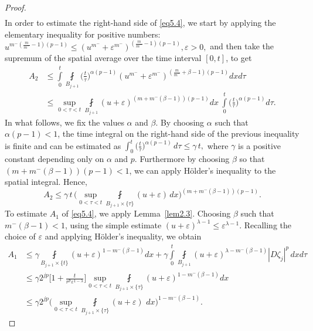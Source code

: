 \documentclass[a4paper,11pt,fullpage]{article}
\numberwithin{equation}{section}
\begin{document}
\begin{proof}
\begin{align}
\end{align}
In order to estimate the right-hand side of \eqref{eq5.4}, we start by applying the elementary inequality for positive numbers: $u^{m^-(\frac{m}{m^-}-1)(p-1)} 
\leqslant(u^{m^-}+\varepsilon^{m^-})^{(\frac{m}{m^-}-1)(p-1)}, \varepsilon>0, $ and then take the supremum of the spatial average over the time interval $[0,t]$, to get
\begin{align*}
A_2&\leqslant\int\limits_0^{t}\fint\limits_{B_{j+1}}\Big(\frac{t}{\tau}\Big)^{\alpha(p-1)} (u^{m^{-}}+\varepsilon^{m^{-}})^{(\frac{m}{m^{-}}+\beta -1)(p-1)} dx d\tau
\\&\leqslant \sup\limits_{0<\tau<t}\fint\limits_{B_{j+1}}(u+\varepsilon)^{(m+m^{-}(\beta -1))(p-1)} dx \ \int\limits_0^t \Big(\frac{t}{\tau}\Big)^{\alpha(p-1)} d\tau.
\end{align*}
In what follows, we fix the values $\alpha$ and $\beta$. By choosing $\alpha$ such that $\alpha(p-1)<1$, the time integral on the right-hand side of the previous inequality is finite and can be estimated as
$\int_0^t \Big(\frac{t}{\tau}\Big)^{\alpha(p-1)}\, d\tau 
\leqslant \gamma\, t,$
where $\gamma$ is a positive constant depending only on $\alpha$ and $p$. Furthermore by choosing $\beta$ so that $(m+m^-(\beta-1))(p-1)<1$,  we can apply H\"older's inequality to the spatial integral. Hence,
\begin{equation}\label{eq5.5}
A_2\leqslant \gamma \,t \,\Big(\sup\limits_{0<\tau<t}\fint\limits_{ B_{j+1}\times \{\tau\}}(u+\varepsilon) \,dx\Big)^{(m+m^{-}(\beta -1))(p-1)}.
\end{equation}
To estimate $A_1$ of \eqref{eq5.4}, we apply Lemma~\ref{lem2.3}. 
Choosing $\beta$ such that $m^{-}(\beta-1)<1$,  using the simple estimate   $(u+\varepsilon)^{\lambda-1}\leqslant \varepsilon^{\lambda-1}$. Recalling the choice of $\varepsilon$
 and applying H\"older's inequality, we obtain
\begin{equation}\label{eq5.6}
\begin{aligned}
A_1&\leqslant \gamma\fint\limits_{B_{j+1}\times\{t\}}(u+\varepsilon)^{1-m^-(\beta-1)} dx+\gamma \int\limits_0^t\fint\limits_{B_{j+1}}
(u+\varepsilon)^{\lambda-m^-(\beta-1)}|D \zeta_{j}|^{p}\,dxd\tau\\
&\leqslant \gamma 2^{jp}\bigg[1+ \frac{t}{r^{p}\varepsilon^{1-\lambda}}\bigg]\sup\limits_{0<\tau<t}\fint\limits_{B_{j+1}\times\{\tau\}}
(u+\varepsilon)^{1-m^-(\beta-1)} dx\\&\leqslant \gamma 2^{jp}
\Big(\sup\limits_{0<\tau<t}\fint\limits_{B_{j+1}\times\{\tau\}}(u+\varepsilon)\,\, dx\Big)^{1-m^-(\beta-1)}.

\end{aligned}
\end{equation}
\end{proof}
\end{document}
